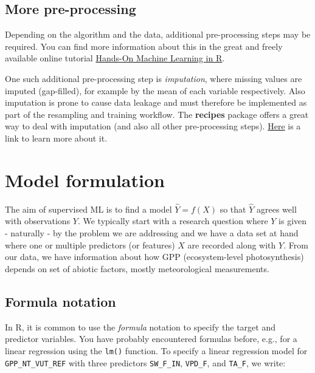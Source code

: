 \documentclass[
]{book}
\begin{document}
\hypertarget{more-pre-processing}{%
\section{More pre-processing}\label{more-pre-processing}}

Depending on the algorithm and the data, additional pre-processing steps may be required. You can find more information about this in the great and freely available online tutorial \href{https://bradleyboehmke.github.io/HOML/engineering.html\#target-engineering}{Hands-On Machine Learning in R}.

One such additional pre-processing step is \emph{imputation}, where missing values are imputed (gap-filled), for example by the mean of each variable respectively. Also imputation is prone to cause data leakage and must therefore be implemented as part of the resampling and training workflow. The \textbf{recipes} package offers a great way to deal with imputation (and also all other pre-processing steps). \href{https://bradleyboehmke.github.io/HOML/engineering.html\#impute}{Here} is a link to learn more about it.

\hypertarget{model-formulation}{%
\chapter{Model formulation}\label{model-formulation}}

The aim of supervised ML is to find a model \(\hat{Y} = f(X)\) so that \(\hat{Y}\) agrees well with observations \(Y\). We typically start with a research question where \(Y\) is given - naturally - by the problem we are addressing and we have a data set at hand where one or multiple predictors (or features) \(X\) are recorded along with \(Y\). From our data, we have information about how GPP (ecosystem-level photosynthesis) depends on set of abiotic factors, mostly meteorological measurements.

\hypertarget{formula-notation}{%
\section{Formula notation}\label{formula-notation}}

In R, it is common to use the \emph{formula} notation to specify the target and predictor variables. You have probably encountered formulas before, e.g., for a linear regression using the \texttt{lm()} function. To specify a linear regression model for \texttt{GPP\_NT\_VUT\_REF} with three predictors \texttt{SW\_F\_IN}, \texttt{VPD\_F}, and \texttt{TA\_F}, we write:
\end{document}
